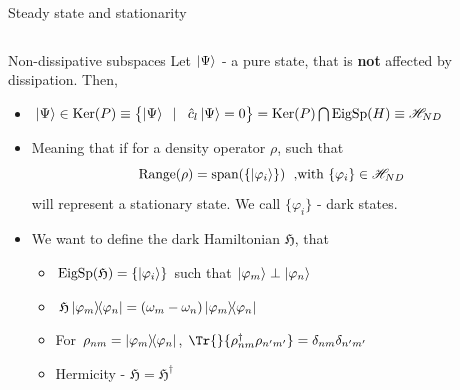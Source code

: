 \documentclass[10pt,xcolor={table,dvipsnames},t]{beamer}
\newcommand{\outerprod}[2]{\ket{#1}\!\!\bra{#2}}
\begin{document}
\begin{frame}{Steady state and stationarity}
\begin{columns}
\begin{column}{0.75\textwidth}
\begin{itemize}
      \end{itemize}
    \end{column}
    \begin{column}{0.25\textwidth}
  \end{column}
  \end{columns}
\end{frame}

\begin{frame}{Non-dissipative subspaces}
    Let $\ket{\Psi}$ - a pure state, that is \textbf{not} affected by dissipation. Then, 
  \begin{itemize}
    \item<1-> $\ket{\Psi} \in \text{Ker}(P) \equiv \bigl\{ \ket{\Psi} \;\; \vert\;\;\; \hat{c}_l \ket{\Psi}=0 \bigr\} = \text{Ker}(P)\bigcap \text{EigSp}(H) \equiv \mathcal{H}_{ND} $
    \item<2-> Meaning that if for a density operator $\rho$, such that  
      \begin{equation}
        \text{Range}(\rho) = \text{span}(\{\ket{\varphi_i}\}) \;\text{ ,with } \{\varphi_i\} \in \mathcal{H}_{ND}
    \end{equation}
    will represent a stationary state. We call $\{\varphi_i\}$ - dark states.
  \item<3-> We want to define the dark Hamiltonian $\mathfrak{H}$, that
    \begin{itemize}
      \item<4-> $\text{EigSp}(\mathfrak{H})=\{\ket{\varphi_i}\}$ such that $\ket{\varphi_m}\perp \ket{\varphi_n}$ 
      \item<4-> $\mathfrak{H}\outerprod{\varphi_m}{\varphi_n}=(\omega_m-\omega_n) \outerprod{\varphi_m}{\varphi_n}$
      \item<4-> For $\rho_{nm} = \outerprod{\varphi_m}{\varphi_n}$, \; $\Tr{}{\rho_{nm}^\dag \rho_{n'm'}}=\delta_{nm}\delta_{n'm'}$
      \item<4-> Hermicity - $\mathfrak{H}=\mathfrak{H}^\dag$
    \end{itemize}
  \end{itemize}
\end{frame}
\end{document}

